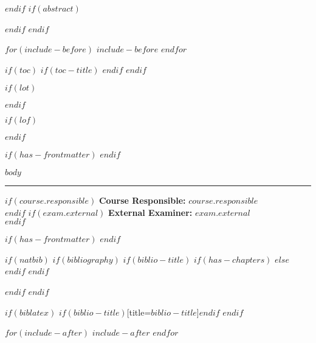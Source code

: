 \documentclass[
$if(fontsize)$$fontsize$,$endif$%
$if(lang)$$babel-lang$,$endif$%
$if(papersize)$$papersize$paper,$endif$%
$for(classoption)$$classoption$$sep$,$endfor$]%
{article}%
\begin{document}
$endif$
$if(abstract)$
\begin{abstract}
$abstract$
\end{abstract}
$endif$
$endif$

$for(include-before)$
$include-before$
$endfor$

$if(toc)$
$if(toc-title)$
\renewcommand*\contentsname{$toc-title$}
$endif$
$endif$

$if(lot)$
\listoftables
$endif$

$if(lof)$
\listoffigures
$endif$

$if(has-frontmatter)$
\mainmatter
$endif$

$body$


\vspace{10pt}\vfill\hrule\vspace{10pt}
$if(course.responsible)$
  \textbf{Course Responsible:} $course.responsible$ \\$endif$
$if(exam.external)$
  \textbf{External Examiner:} $exam.external$ \\$endif$

$if(has-frontmatter)$
\backmatter
$endif$

$if(natbib)$
$if(bibliography)$
$if(biblio-title)$
$if(has-chapters)$
\renewcommand\bibname{$biblio-title$}
$else$
\renewcommand\refname{$biblio-title$}
$endif$ %
$endif$ %

$endif$ %
$endif$ %

$if(biblatex)$
\printbibliography$if(biblio-title)$[title=$biblio-title$]$endif$
$endif$

$for(include-after)$
$include-after$
$endfor$
\end{document}
